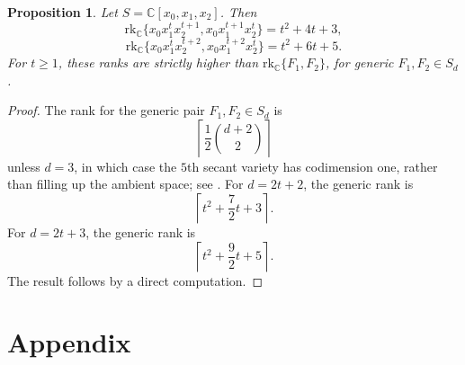 \documentclass{amsart}
\theoremstyle{plain}
\newtheorem{proposition}[theorem]{Proposition}
\theoremstyle{definition}
\theoremstyle{remark}
\newcommand{\rk}{\mathrm{rk}}
\newcommand{\CC}{\mathbb{C}}
\begin{document}
\begin{proposition}
Let $S=\CC[x_0,x_1,x_2]$. Then
\[\rk_{\CC} \lbrace x_0x_1^tx_2^{t+1},x_0x_1^{t+1}x_2^t\rbrace=t^2+4t+3,\]
\[\rk_{\CC} \lbrace x_0x_1^tx_2^{t+2},x_0x_1^{t+2}x_2^t\rbrace=t^2+6t+5.\]
\noindent For $t\geq 1$, these ranks are strictly higher than $\rk_{\CC} \lbrace F_1,F_2\rbrace$, for generic $F_1,F_2\in S_d$.
\end{proposition}
\begin{proof}
The rank for the generic pair $F_1,F_2\in S_d$ is
$$
\left \lceil \frac{1}{2} \binom{d+2}{2} \right \rceil
$$
\noindent unless $d=3$, in which case the $5$th secant variety has codimension one, rather than filling up the ambient space; see \cite[Theorem 1.3]{BD2010}.
For $d=2t+2$, the generic rank is
\[\left\lceil t^2+\frac{7}{2}t+3\right\rceil.\]
\noindent For $d=2t+3$, the generic rank is
\[\left\lceil t^2+\frac{9}{2}t+5\right\rceil.\]
The result follows by a direct computation.
\end{proof}



\section{Appendix}
\end{document}

